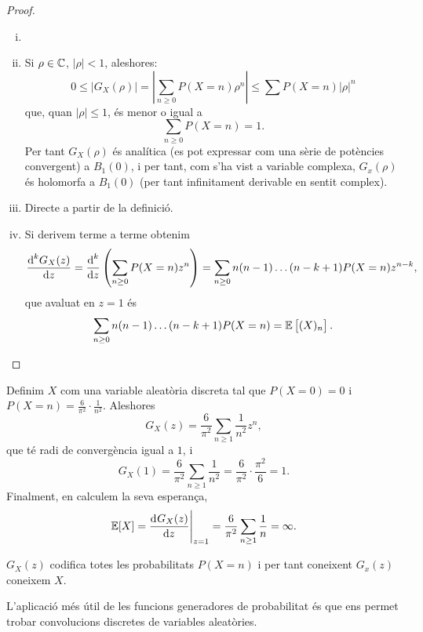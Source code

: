 \begin{proof}
    \begin{enumerate}[i)]
        \item[]
        \item Si $\rho \in \mathbb{C}$, $|\rho| < 1$, aleshores:
            \[
                0 \leq |G_X(\rho)| = \left|\sum_{n \geq 0} P(X = n) \rho^n \right|
                \leq \sum P(X=n) |\rho|^n
            \]
            que, quan $|\rho| \leq 1$, \'es menor o igual a
            \[
                \sum_{n \geq 0} P(X = n) = 1.
            \]
            Per tant $G_X(\rho)$ \'es analítica (es pot expressar com una sèrie de
            potències convergent) a $B_1(0)$, i per tant, com s'ha vist a variable
            complexa, $G_x(\rho)$ \'es holomorfa a $B_1(0)$ (per tant infinitament
            derivable en sentit complex).
        \item  Directe a partir de la definició.
        \item Si derivem terme a terme obtenim
            \[
                \frac{\text{d}^kG_X(z)}{\text{d}z} = \frac{\text{d}^k}{\text{d}z} \left( \sum_{n \geq 0} P(X = n) z^n\right)=
                \sum_{n \geq 0} n(n-1)\dots(n-k+1)P(X = n) z^{n-k},
            \]
            que avaluat en $z = 1$ \'es
            \[ 
                \sum_{n \geq 0} n(n-1)\dots(n-k+1)P(X=n) = \operatorname{\mathbb{E}}\left[(X)_n\right].
            \]
    \end{enumerate}
\end{proof}

\begin{example}
   Definim $X$ com una variable aleatòria discreta tal que $P(X = 0) = 0$ i
   $P(X = n) = \frac{6}{\pi^2}\cdot \frac{1}{n^2}$. Aleshores
    \[
        G_X(z) =  \frac{6}{\pi^2} \sum_{n \geq 1} \frac{1}{n^2}z^n,
    \]
    que t\'e radi de convergència igual a $1$, i
    \[
        G_X(1) = \frac{6}{\pi^2} \sum_{n \geq 1} \frac{1}{n^2} =
        \frac{6}{\pi^2}\cdot \frac{\pi^2}{6} = 1.
    \]
    Finalment, en calculem la seva esperança,
    \[
        \esp[X] = \eval{\dv{G_X(z)}{z}}_{z = 1} = 
        \frac{6}{\pi^2}\sum_{n \geq 1} \frac{1}{n} = \infty.
    \]
\end{example}

\begin{obs}
    $G_X(z)$ codifica totes les probabilitats $P(X = n)$ i per tant coneixent
    $G_x(z)$ coneixem $X$.
\end{obs}

L'aplicació m\'es útil de les funcions generadores de probabilitat \'es que
ens permet trobar convolucions discretes de variables aleatòries.


